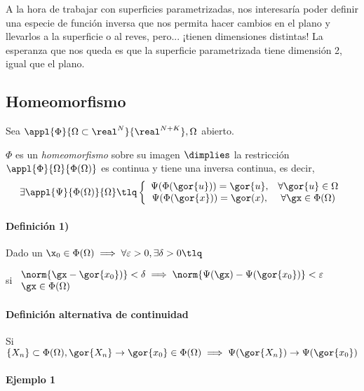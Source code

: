 A la hora de trabajar con superficies parametrizadas, nos interesaría poder definir una especie de función inversa que nos permita hacer cambios en el plano y llevarlos a la superficie o al reves, pero... ¡tienen dimensiones distintas! La esperanza que nos queda es que la superficie parametrizada tiene dimensión 2, igual que el plano.


\subsection{Homeomorfismo}
\begin{defn}[Homeomorfismo]
Sea $\appl{\Phi}{\Omega\subset\real^N}{\real^{N+K}}, \Omega$ abierto.

$\Phi$ es un \emph{homeomorfismo} sobre su imagen $\dimplies $ la restricción $\appl{\Phi}{\Omega}{\Phi(\Omega)}$ es continua y tiene una inversa continua,
es decir, \[\exists \appl{\Psi}{\Phi(\Omega)}{\Omega} \tlq 
\left\{ \begin{array}{cc} 
\Psi(\Phi(\gor{u})) = \gor{u}, &\forall \gor{u} \in \Omega\\ 
\Psi(\Phi(\gor{x})) = \gor(x), &\forall \gx \in \Phi(\Omega)
\end{array}\right.\]

\paragraph{Definición 1)}
Dado un $\displaystyle \x_0 \in \Phi(\Omega) \implies \forall \varepsilon >0, \exists \delta>0 \tlq$ 

si $\begin{array}{lc}
\norm{\gx-\gor{x_0})} < \delta \implies \norm{\Psi(\gx)-\Psi(\gor{x_0})}<\varepsilon\\
\gx \in \Phi(\Omega)
\end{array}$

\paragraph{Definición alternativa de continuidad}
Si $\{X_n\}\subset\Phi(\Omega), \gor{X_n} \rightarrow \gor{x_0}\in\Phi(\Omega) \implies \Psi(\gor{X_n}) \rightarrow \Psi(\gor{x_0})$

\end{defn}

\paragraph{Ejemplo 1}


